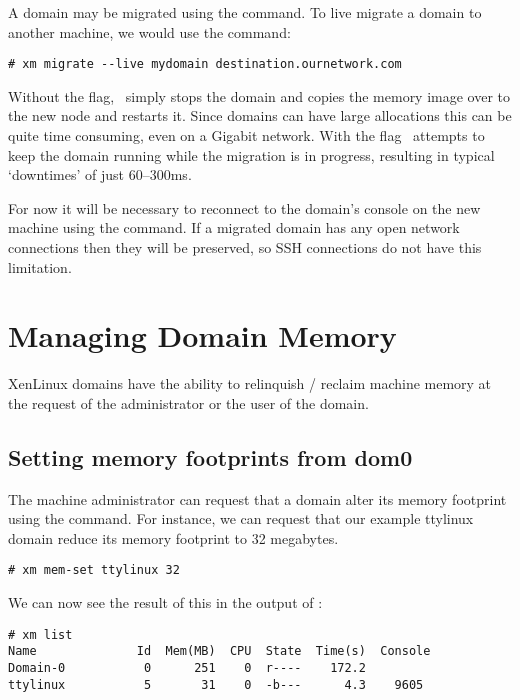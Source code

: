 A domain may be migrated using the  command.  To live
migrate a domain to another machine, we would use the command:

\begin{verbatim}
# xm migrate --live mydomain destination.ournetwork.com
\end{verbatim}

Without the  flag, \xend\ simply stops the domain and
copies the memory image over to the new node and restarts it. Since
domains can have large allocations this can be quite time consuming,
even on a Gigabit network. With the  flag \xend\ attempts
to keep the domain running while the migration is in progress,
resulting in typical `downtimes' of just 60--300ms.

For now it will be necessary to reconnect to the domain's console on
the new machine using the  command.  If a migrated
domain has any open network connections then they will be preserved,
so SSH connections do not have this limitation.


\section{Managing Domain Memory}

XenLinux domains have the ability to relinquish / reclaim machine
memory at the request of the administrator or the user of the domain.

\subsection{Setting memory footprints from dom0}

The machine administrator can request that a domain alter its memory
footprint using the  command.  For instance, we can
request that our example ttylinux domain reduce its memory footprint
to 32 megabytes.

\begin{verbatim}
# xm mem-set ttylinux 32
\end{verbatim}

We can now see the result of this in the output of :

\begin{verbatim}
# xm list
Name              Id  Mem(MB)  CPU  State  Time(s)  Console
Domain-0           0      251    0  r----    172.2        
ttylinux           5       31    0  -b---      4.3    9605
\end{verbatim}

